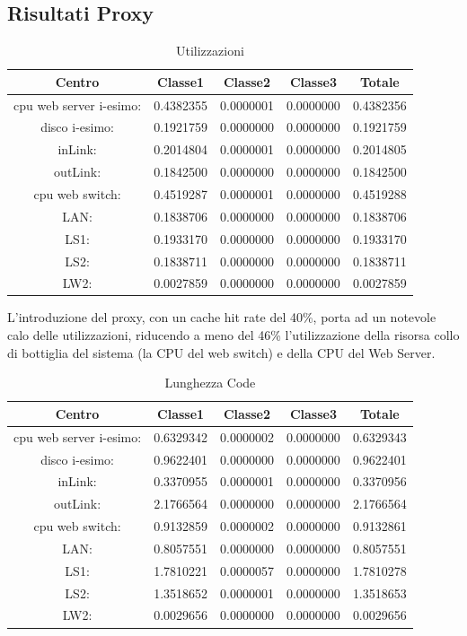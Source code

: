 \subsection{Risultati Proxy}
\begin{table}[htbp]
\begin{center}
\begin{tabular}{||c|c|c|c|c||}
\hline
Centro &Classe1 &Classe2 &Classe3 &Totale\\
\hline
\hline
 cpu web server i-esimo: 	&0.4382355	&0.0000001	&0.0000000	&0.4382356\\
\hline
 disco i-esimo: 	&0.1921759	&0.0000000	&0.0000000	&0.1921759\\
\hline
 inLink: 	&0.2014804	&0.0000001	&0.0000000	&0.2014805\\
\hline
 outLink: 	&0.1842500	&0.0000000	&0.0000000	&0.1842500\\
\hline
 cpu web switch: 	&0.4519287	&0.0000001	&0.0000000	&0.4519288\\
\hline
 LAN: 	&0.1838706	&0.0000000	&0.0000000	&0.1838706\\
\hline
 LS1: 	&0.1933170	&0.0000000	&0.0000000	&0.1933170\\
\hline
 LS2:	&0.1838711	&0.0000000	&0.0000000	&0.1838711\\
\hline
 LW2: 	&0.0027859	&0.0000000	&0.0000000	&0.0027859\\
\hline
\end{tabular}
\end{center}
\caption{Utilizzazioni}
\label{utilizzazioni}
\end{table}
L'introduzione del proxy, con un cache hit rate del 40\%, porta ad un notevole calo delle utilizzazioni, riducendo a meno del 46\% l'utilizzazione della risorsa collo di bottiglia del sistema (la CPU del web switch) e della CPU del Web Server. 
\begin{table}[htbp]
\begin{center}
\begin{tabular}{||c|c|c|c|c||}
\hline
Centro &Classe1 &Classe2 &Classe3 &Totale\\
\hline
\hline
 cpu web server i-esimo: 	&0.6329342	&0.0000002	&0.0000000	&0.6329343\\
\hline
 disco i-esimo: 	&0.9622401	&0.0000000	&0.0000000	&0.9622401\\
\hline
 inLink: 	&0.3370955	&0.0000001	&0.0000000	&0.3370956\\
\hline
 outLink: 	&2.1766564	&0.0000000	&0.0000000	&2.1766564\\
\hline
 cpu web switch: 	&0.9132859	&0.0000002	&0.0000000	&0.9132861\\
\hline
 LAN: 	&0.8057551	&0.0000000	&0.0000000	&0.8057551\\
\hline
 LS1: 	&1.7810221	&0.0000057	&0.0000000	&1.7810278\\
\hline
 LS2: 	&1.3518652	&0.0000001	&0.0000000	&1.3518653\\
\hline
 LW2: 	&0.0029656	&0.0000000	&0.0000000	&0.0029656\\
\hline
\end{tabular}
\end{center}
\caption{Lunghezza Code}
\label{lunghezzacode}
\end{table}
